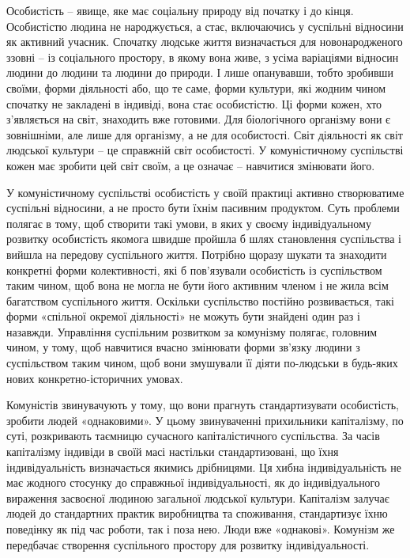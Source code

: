 \documentclass[12pt,a4paper,openany]{book}
\begin{document}
Особистість – явище, яке має соціальну природу від початку і до кінця. Особистістю людина не народжується, а стає, включаючись у суспільні відносини як активний учасник. Спочатку людське життя визначається для новонародженого ззовні – із соціального простору, в якому вона живе, з усіма варіаціями відносин людини до людини та людини до природи. І лише опанувавши, тобто зробивши своїми, форми діяльності або, що те саме, форми культури, які жодним чином спочатку не закладені в індивіді, вона стає особистістю. Ці форми кожен, хто з’являється на світ, знаходить вже готовими. Для біологічного організму вони є зовнішніми, але лише для організму, а не для особистості. Світ діяльності як світ людської культури – це справжній світ особистості. У комуністичному суспільстві кожен має зробити цей світ своїм, а це означає – навчитися змінювати його.

У комуністичному суспільстві особистість у своїй практиці активно створюватиме суспільні відносини, а не просто бути їхнім пасивним продуктом. Суть проблеми полягає в тому, щоб створити такі умови, в яких у своєму індивідуальному розвитку особистість якомога швидше пройшла б шлях становлення суспільства і вийшла на передову суспільного життя. Потрібно щоразу шукати та знаходити конкретні форми колективності, які б пов’язували особистість із суспільством таким чином, щоб вона не могла не бути його активним членом і не жила всім багатством суспільного життя. Оскільки суспільство постійно розвивається, такі форми «спільної окремої діяльності» не можуть бути знайдені один раз і назавжди. Управління суспільним розвитком за комунізму полягає, головним чином, у тому, щоб навчитися вчасно змінювати форми зв’язку людини з суспільством таким чином, щоб вони змушували її діяти по-людськи в будь-яких нових конкретно-історичних умовах.

Комуністів звинувачують у тому, що вони прагнуть стандартизувати особистість, зробити людей «однаковими». У цьому звинуваченні прихильники капіталізму, по суті, розкривають таємницю сучасного капіталістичного суспільства. За часів капіталізму індивіди в своїй масі настільки стандартизовані, що їхня індивідуальність визначається якимись дрібницями. Ця хибна індивідуальність не має жодного стосунку до справжньої індивідуальності, як до індивідуального вираження засвоєної людиною загальної людської культури. Капіталізм залучає людей до стандартних практик виробництва та споживання, стандартизує їхню поведінку як під час роботи, так і поза нею. Люди вже «однакові». Комунізм же передбачає створення суспільного простору для розвитку індивідуальності.
\end{document}
